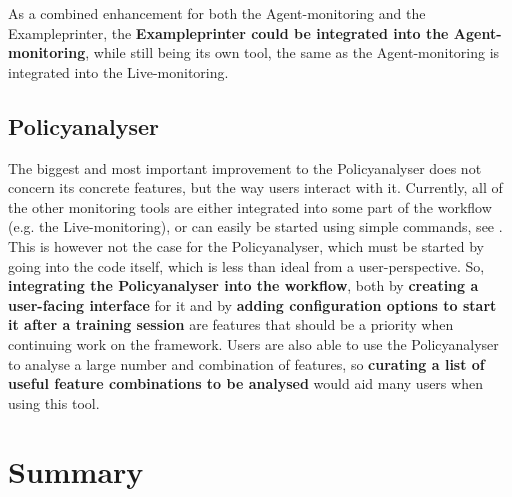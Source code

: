 As a combined enhancement for both the Agent-monitoring and the Exampleprinter, the \textbf{Exampleprinter could be integrated into the Agent-monitoring}, while still being its own tool, the same as the Agent-monitoring is integrated into the Live-monitoring.

\subsection{Policyanalyser}\label{subsec:FuturePolicyAnalyser}

The biggest and most important improvement to the Policyanalyser does not concern its concrete features, but the way users interact with it. Currently, all of the other monitoring tools are either integrated into some part of the workflow (e.g. the Live-monitoring), or can easily be started using simple commands, see . This is however not the case for the Policyanalyser, which must be started by going into the code itself, which is less than ideal from a user-perspective. So, \textbf{integrating the Policyanalyser into the workflow}, both by \textbf{creating a user-facing interface} for it and by \textbf{adding configuration options to start it after a training session} are features that should be a priority when continuing work on the framework. Users are also able to use the Policyanalyser to analyse a large number and combination of features, so \textbf{curating a list of useful feature combinations to be analysed} would aid many users when using this tool.

\section{Summary}

